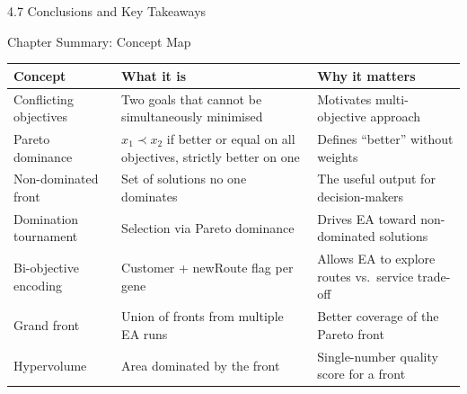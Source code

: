 \documentclass[aspectratio=169,10pt]{beamer}
\begin{document}
\begin{frame}[allowframebreaks]{4.7 Conclusions and Key Takeaways}
  \begin{block}{Chapter Summary: Concept Map}
    \begin{center}
      \small
      \begin{tabular}{p{3.5cm} p{4.5cm} p{4.5cm}}
        \toprule
        \textbf{Concept} & \textbf{What it is} & \textbf{Why it matters} \\
        \midrule
        Conflicting objectives &
          Two goals that cannot be simultaneously minimised &
          Motivates multi-objective approach \\
        Pareto dominance &
          $x_1 \prec x_2$ if better or equal on all objectives, strictly better on one &
          Defines ``better'' without weights \\
        Non-dominated front &
          Set of solutions no one dominates &
          The useful output for decision-makers \\
        Domination tournament &
          Selection via Pareto dominance &
          Drives EA toward non-dominated solutions \\
        Bi-objective encoding &
          Customer + newRoute flag per gene &
          Allows EA to explore routes vs.\ service trade-off \\
        Grand front &
          Union of fronts from multiple EA runs &
          Better coverage of the Pareto front \\
        Hypervolume &
          Area dominated by the front &
          Single-number quality score for a front \\
        \bottomrule
      \end{tabular}
    \end{center}
  \end{block}

\end{frame}
\end{document}
